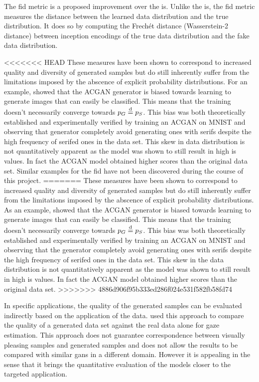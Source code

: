 The \acrlong{fid} metric is a proposed improvement over the \acrlong{is}. Unlike the \acrlong{is}, the \acrlong{fid} metric measures the distance between the learned data distribution and the true distribution. It does so by computing the Frechét distance (Wasserstein-2 distance) between inception encodings of the true data distribution and the fake data distribution.

<<<<<<< HEAD
These measures have been shown to correspond to increased quality and diversity of generated samples but do still inherently suffer from the limitations imposed by the abscence of explicit probability distributions. For an example, \textcite{shuac2017acganisbad} showed that the ACGAN generator is biased towards learning to generate images that can easily be classified. This means that the training doesn't necessarily converge towards $p_G \stackrel{\text{d}}{=} p_S$. This bias was both theoretically established and experimentally verified by training an ACGAN on MNIST and observing that generator completely avoid generating ones with serifs despite the high frequency of serifed ones in the data set. This skew in data distribution is not quantitatively apparent as the model was shown to still result in high \acrshort{is} values. In fact the ACGAN model obtained higher scores than the original data set. Similar examples for the \acrshort{fid} have not been discovered during the course of this project. 
=======
These measures have been shown to correspond to increased quality and diversity of generated samples but do still inherently suffer from the limitations imposed by the abscence of explicit probability distributions. As an example, \textcite{shuac2017acganisbad} showed that the ACGAN generator is biased towards learning to generate images that can easily be classified. This means that the training doesn't necessarily converge towards $p_G \stackrel{\text{d}}{=} p_S$. This bias was both theoretically established and experimentally verified by training an ACGAN on MNIST and observing that the generator completely avoid generating ones with serifs despite the high frequency of serifed ones in the data set. This skew in the data distribution is not quantitatively apparent as the model was shown to still result in high \acrshort{is} values. In fact the ACGAN model obtained higher scores than the original data set.
>>>>>>> 4886d906f95b333ed286f024e531f582fb58fd74

In specific applications, the quality of the generated samples can be evaluated indirectly based on the application of the data. \textcite{shrivastava2016learning} used this approach to compare the quality of a generated data set against the real data alone for gaze estimation. This approach does not guarantee correspondence between visually pleasing samples and generated samples and does not allow the results to be compared with similar \acrshort{gans} in a different domain. However it is appealing in the sense that it brings the quantitative evaluation of the models closer to the targeted application. 


